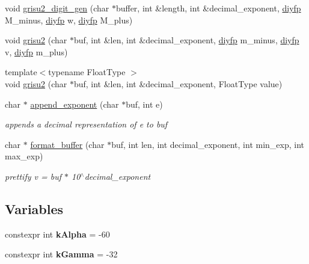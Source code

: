 \begin{DoxyCompactItemize}
\item 
void \hyperlink{namespacenlohmann_1_1detail_1_1dtoa__impl_a9b899c72b0e1e3dd46d75c2b4e6bcdfb}{grisu2\+\_\+digit\+\_\+gen} (char $\ast$buffer, int \&length, int \&decimal\+\_\+exponent, \hyperlink{structnlohmann_1_1detail_1_1dtoa__impl_1_1diyfp}{diyfp} M\+\_\+minus, \hyperlink{structnlohmann_1_1detail_1_1dtoa__impl_1_1diyfp}{diyfp} w, \hyperlink{structnlohmann_1_1detail_1_1dtoa__impl_1_1diyfp}{diyfp} M\+\_\+plus)
\item 
void \hyperlink{namespacenlohmann_1_1detail_1_1dtoa__impl_a05b681dcb8569b9784c6dccfadb01633}{grisu2} (char $\ast$buf, int \&len, int \&decimal\+\_\+exponent, \hyperlink{structnlohmann_1_1detail_1_1dtoa__impl_1_1diyfp}{diyfp} m\+\_\+minus, \hyperlink{structnlohmann_1_1detail_1_1dtoa__impl_1_1diyfp}{diyfp} v, \hyperlink{structnlohmann_1_1detail_1_1dtoa__impl_1_1diyfp}{diyfp} m\+\_\+plus)
\item 
{\footnotesize template$<$typename Float\+Type $>$ }\\void \hyperlink{namespacenlohmann_1_1detail_1_1dtoa__impl_aab7a9670a4f4704a5d0347ad7588576b}{grisu2} (char $\ast$buf, int \&len, int \&decimal\+\_\+exponent, Float\+Type value)
\item 
char $\ast$ \hyperlink{namespacenlohmann_1_1detail_1_1dtoa__impl_a84733638b826eda624488f5fa4521e0b}{append\+\_\+exponent} (char $\ast$buf, int e)
\begin{DoxyCompactList}\small\item\em appends a decimal representation of e to buf \end{DoxyCompactList}\item 
char $\ast$ \hyperlink{namespacenlohmann_1_1detail_1_1dtoa__impl_a12c1c5d8b46ba9702186445e73f86afe}{format\+\_\+buffer} (char $\ast$buf, int len, int decimal\+\_\+exponent, int min\+\_\+exp, int max\+\_\+exp)
\begin{DoxyCompactList}\small\item\em prettify v = buf $\ast$ 10$^\wedge$decimal\+\_\+exponent \end{DoxyCompactList}\end{DoxyCompactItemize}
\subsection*{Variables}
\begin{DoxyCompactItemize}
\item 
constexpr int {\bfseries k\+Alpha} = -\/60\hypertarget{namespacenlohmann_1_1detail_1_1dtoa__impl_ac1ea1316de0b4a219f707c76b1db1966}{}\label{namespacenlohmann_1_1detail_1_1dtoa__impl_ac1ea1316de0b4a219f707c76b1db1966}

\item 
constexpr int {\bfseries k\+Gamma} = -\/32\hypertarget{namespacenlohmann_1_1detail_1_1dtoa__impl_a4a750fcc38da1ce68b7e25ab3a230e20}{}\label{namespacenlohmann_1_1detail_1_1dtoa__impl_a4a750fcc38da1ce68b7e25ab3a230e20}

\end{DoxyCompactItemize}


